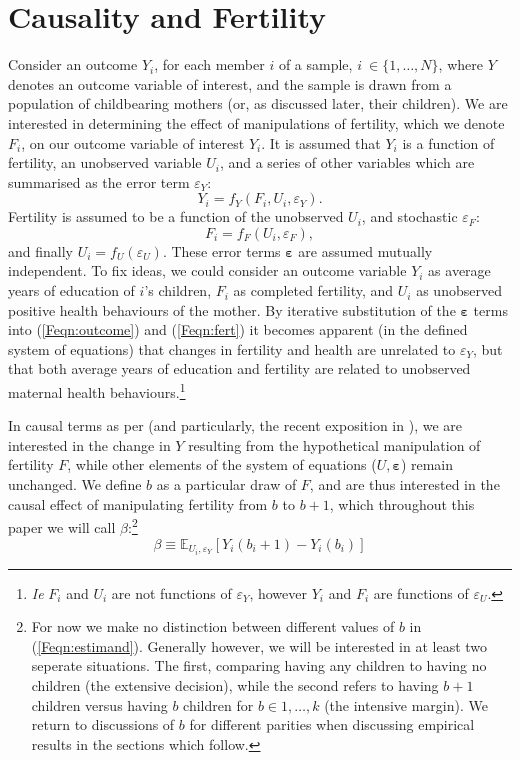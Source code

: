 \section{Causality and Fertility}
\label{Fscn:causality}
Consider an outcome $Y_i$, for each member $i$ of a sample, $i\ \in \{1,\ldots,
N\}$, where $Y$ denotes an outcome variable of interest, and the sample is drawn
from a population of childbearing mothers (or, as discussed later, their 
children). We are 
interested in determining the effect of manipulations of fertility, which we
denote $F_i$, on our outcome variable of interest $Y_i$.  It is assumed that 
$Y_i$ is a function of fertility, an unobserved variable $U_i$, and a series of 
other variables which are summarised as the error term $\varepsilon_Y$:
\begin{equation}
\label{Feqn:outcome}
Y_i=f_Y(F_i,U_i,\varepsilon_Y).
\end{equation}
Fertility is assumed to be a function of the unobserved $U_i$, and stochastic 
$\varepsilon_F$:
\begin{equation}
\label{Feqn:fert}
F_i=f_F(U_i,\varepsilon_F),
\end{equation}
and finally $U_i=f_U(\varepsilon_U)$. These error terms $\bm\varepsilon$ are 
assumed mutually independent. To fix ideas, we could consider an outcome variable 
$Y_i$ as average years of education of $i$'s children, $F_i$ as completed 
fertility, and $U_i$ as unobserved positive health behaviours of the mother. By 
iterative substitution of the $\bm\varepsilon$ terms into (\ref{Feqn:outcome}) 
and (\ref{Feqn:fert}) it becomes apparent (in the defined system of equations) 
that changes in fertility and health are unrelated to $\varepsilon_Y$, but that 
both average years of education and fertility are related to unobserved maternal 
health behaviours.\footnote{\emph{Ie} $F_i$ and $U_i$ are not functions of 
$\varepsilon_Y$, however $Y_i$ and $F_i$ are functions of $\varepsilon_U$.}

In causal terms as per \citet{Haavelmo1943,Haavelmo1944} (and particularly, the
recent exposition in \citet{HeckmanPinto2015}), we are interested in the change
in $Y$ resulting from the hypothetical manipulation of fertility $F$, while 
other elements of the system of equations ($U,\bm\varepsilon$) remain unchanged.  
We define $b$ as a particular draw of $F$, and are thus interested in the causal 
effect of manipulating fertility from $b$ to $b+1$, which throughout this paper
we will call $\beta$:\footnote{For now we make no distinction between different 
values of $b$ in (\ref{Feqn:estimand}).  Generally however, we will be interested 
in at least two seperate situations. The first, comparing having any children 
to having no children (the extensive decision), while the second refers to 
having $b+1$ children versus having $b$ children for $b\in{1,\ldots,k}$ (the 
intensive margin).  We return to discussions of $b$ for different parities when
discussing empirical results in the sections which follow.}
\begin{equation}
\label{Feqn:estimand}
\beta\equiv\mathbb{E}_{U_i,\varepsilon_Y}[Y_i(b_i+1)-Y_i(b_i)]
\end{equation}


